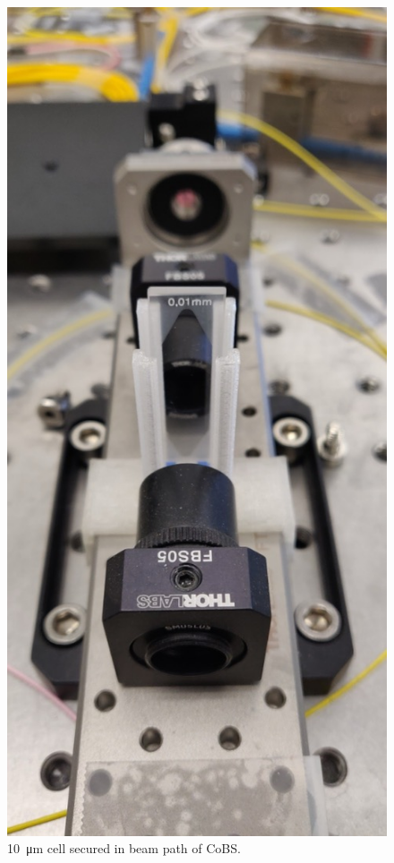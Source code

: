 \begin{figure}[t]
  \centering
  \includegraphics[height=.8\textheight]{figs/4-Raman/10umCS2.jpg}
  \caption{\SI{10}{\micro\meter}  cell secured in beam path of \acl{CoBS}.}
  \label{fig:Raman:10umCS2}
\end{figure}

